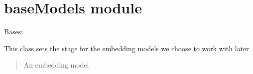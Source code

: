 \documentclass[letterpaper,10pt,english]{sphinxmanual}
\begin{document}
\section{baseModels module}
\label{\detokenize{fldModules/baseModels:module-baseModels}}\label{\detokenize{fldModules/baseModels:basemodels-module}}\label{\detokenize{fldModules/baseModels::doc}}

\begin{fulllineitems}
\label{\detokenize{fldModules/baseModels:baseModels.baseModels}}
\pysigstartsignatures
{}
\pysigstopsignatures
\sphinxAtStartPar
Bases: 

\begin{fulllineitems}
\label{\detokenize{fldModules/baseModels:baseModels.baseModels.SBERT_model}}
\pysigstartsignatures
{}
\pysigstopsignatures
\sphinxAtStartPar
This class sets the stage for the embedding models we choose to work with later
\begin{quote}\begin{description}
\sphinxAtStartPar
An embedding model

\end{description}\end{quote}

\end{fulllineitems}



\end{fulllineitems}
\end{document}
